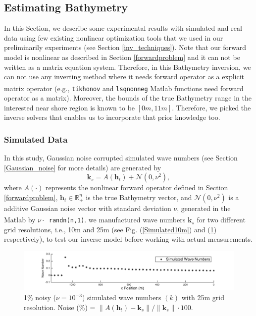 \subsection{Estimating Bathymetry}

In this Section, we describe some experimental results with simulated and real data using few existing nonlinear optimization tools that we used in our preliminarily experiments (see Section \ref{inv_techniques}). Note that our forward model is nonlinear as described in Section \ref{forwardproblem} and it can not be written as a matrix equation system. Therefore, in this Bathymetry inversion, we can not use any inverting method where it needs forward operator as a explicit matrix operator (e.g., \verb|tikhonov| and  \verb|lsqnonneg|     
 Matlab\textsuperscript{\textregistered} functions need forward operator as a matrix). Moreover, the bounds of the true Bathymetry range in the interested near shore region is known to be $[0m, 11m]$. Therefore, we picked the inverse solvers that enables us to incorporate that prior knowledge too. 

\subsubsection{Simulated Data}
In this study, Gaussian noise corrupted simulated wave numbers (see Section \ref{Gaussian_noise} for more details) are generated by 
\begin{equation}
\mathbf{k}_s = A(\mathbf{h}_t) + \mathcal{N}(0, \nu^2),
\end{equation}
where $A(\cdot)$ represents the nonlinear forward operator defined in Section \ref{forwardproblem}, $\mathbf{h}_t \in \mathbb{R}_+^n$ is the true Bathymetry vector, and $\mathcal{N}(0, \nu^2)$ is a additive Gaussian noise vector with standard deviation $\nu$, generated in the Matlab\textsuperscript{\textregistered} by $\nu \cdot $\verb| randn(n,1)|. we manufactured wave numbers $\mathbf{k}_s$ for two different grid resolutions, i.e., 10m and 25m (see Fig. (\ref{Simulated10m}) and (\ref{Simulated25m}) respectively), to test our inverse model before working with actual measurements. 



\begin{figure}[H]
\center
\includegraphics[scale=0.6]{img/simulated_data_k25m.png} 
\caption{1\% noisy ($\nu = 10^{-3}$) simulated wave numbers $(k)$ with 25m grid resolution. Noise (\%) = $\|A(\mathbf{h}_t) -  \mathbf{k}_s\| / \|  \mathbf{k}_s \| \cdot 100$.}
\label{Simulated25m}
\end{figure}


